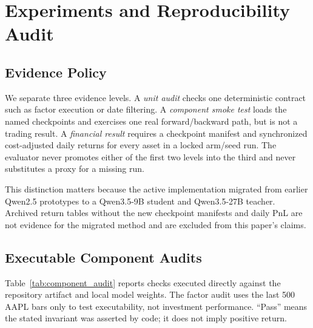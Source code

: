 \section{Experiments and Reproducibility Audit}
\label{sec:experiments}

\subsection{Evidence Policy}

We separate three evidence levels. A \emph{unit audit} checks one deterministic contract such as factor execution or date filtering. A \emph{component smoke test} loads the named checkpoints and exercises one real forward/backward path, but is not a trading result. A \emph{financial result} requires a checkpoint manifest and synchronized cost-adjusted daily returns for every asset in a locked arm/seed run. The evaluator never promotes either of the first two levels into the third and never substitutes a proxy for a missing run.

This distinction matters because the active implementation migrated from earlier Qwen2.5 prototypes to a Qwen3.5-9B student and Qwen3.5-27B teacher. Archived return tables without the new checkpoint manifests and daily PnL are not evidence for the migrated method and are excluded from this paper's claims.

\subsection{Executable Component Audits}

Table~\ref{tab:component_audit} reports checks executed directly against the repository artifact and local model weights. The factor audit uses the last 500 AAPL bars only to test executability, not investment performance. ``Pass'' means the stated invariant was asserted by code; it does not imply positive return.

